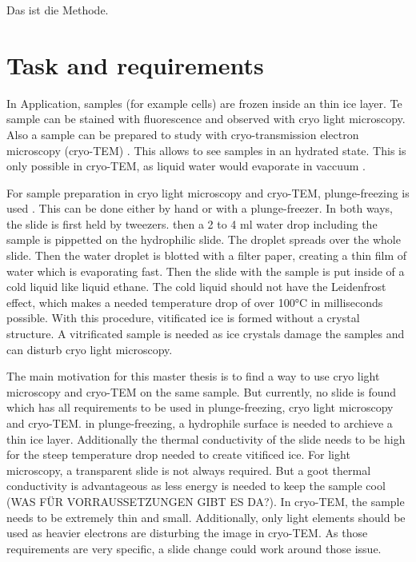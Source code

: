 Das ist die Methode.

\section{Task and requirements}

In Application, samples (for example cells) are frozen inside an thin ice layer. Te sample can be stained with fluorescence and observed with cryo light microscopy. Also a sample can be prepared to study with cryo-transmission electron microscopy (cryo-TEM) . This allows to see samples in an hydrated state. This is only possible in cryo-TEM, as liquid water would evaporate in vaccuum \cite{Danino.2012}.

For sample preparation in cryo light microscopy and cryo-TEM, plunge-freezing is used \cite{Danino.2012} \cite{Faoro.2018}. This can be done either by hand or with a plunge-freezer. In both ways, the slide is first held by tweezers. then a 2 to 4 ml water drop including the sample is pippetted on the hydrophilic slide. The droplet spreads over the whole slide. Then the water droplet is blotted with a filter paper, creating a thin film of water which is evaporating fast. Then the slide with the sample is put inside of a cold liquid like liquid ethane. The cold liquid should not have the Leidenfrost effect, which makes a needed temperature drop of over 100°C in milliseconds possible. With this procedure, vitificated ice is formed without a crystal structure. A vitrificated sample is needed as ice crystals damage the samples and can disturb cryo light microscopy.

The main motivation for this master thesis is to find a way to use cryo light microscopy and cryo-TEM on the same sample. But currently, no slide is found which has all requirements to be used in plunge-freezing, cryo light microscopy and cryo-TEM. in plunge-freezing, a hydrophile surface is needed to archieve a thin ice layer. Additionally the thermal conductivity of the slide needs to be high for the steep temperature drop needed to create vitificed ice. For light microscopy, a transparent slide is not always required. But a goot thermal conductivity is advantageous as less energy is needed to keep the sample cool (WAS FÜR VORRAUSSETZUNGEN GIBT ES DA?). In cryo-TEM, the sample needs to be extremely thin and small. Additionally, only light elements should be used as heavier electrons are disturbing the image in cryo-TEM. As those requirements are very specific, a slide change could work around those issue.

